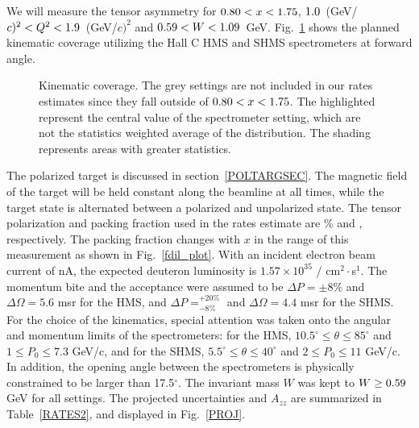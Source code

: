 \label{EXP}
We will measure the tensor asymmetry \Azz for $0.80<x<1.75$, $1.0$~(GeV/$c)^2 < Q^2 <1.9$~(GeV/$c)^2$ and $0.59 < W < 1.09$~GeV. Fig.~\ref{kincov} shows the planned kinematic coverage utilizing the Hall C HMS and SHMS spectrometers at forward angle.

\begin{figure}
\begin{center}
\caption{\label{kincov} Kinematic coverage.  The grey settings are not included in our rates estimates since they fall outside of $0.80 < x < 1.75$. The highlighted represent the central value of the spectrometer setting, which are not the statistics weighted average of the distribution. The shading represents areas with greater statistics.}
\end{center}
\end{figure}


The polarized \TARGET target is discussed in section~\ref{POLTARGSEC}.  The magnetic field of the target will be held constant along the beamline at all times, while the target state is alternated between a polarized and unpolarized state.
The tensor polarization and packing fraction used in the rates estimate are \PZZ\% and \PF, respectively. 
The packing fraction changes with $x$ in the range of this measurement as shown in Fig.~\ref{fdil_plot}.
With an incident
electron beam current of \CURRENT nA, the
expected deuteron luminosity is $1.57\times 10^{35}$ / cm$^2\cdot$s$^1$. The momentum bite and the acceptance
were assumed to be $\Delta P = \pm 8\%$ and $\Delta\Omega = 5.6$ msr for the HMS, and $\Delta P= ^{+20\%}_{-8\%}$ 
and $\Delta\Omega =4.4$ msr for the SHMS. 
%
For the choice of the kinematics,
special attention was taken onto the angular and momentum limits of the spectrometers: for the
HMS, $10.5^{\circ} \le \theta \le 85^{\circ}$ and $1 \le P_0 \le 7.3$ GeV/c, and for the SHMS,
$5.5^{\circ} \le \theta \le 40^{\circ}$ and $2 \le P_0 \le 11$ GeV/c. In addition, the
opening angle between the spectrometers is physically constrained to be larger than 17.5$^{\circ}$.
The invariant mass $W$ was kept to $W \ge 0.59$ GeV for all settings.
The projected 
uncertainties and $A_{zz}$
are summarized in Table~\ref{RATES2}, and displayed in
Fig.~\ref{PROJ}.  

